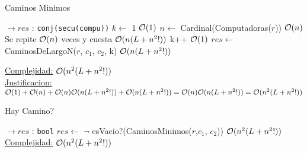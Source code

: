 \begin{Algoritmos}
\begin{algorithm}
\caption{Caminos Minimos}
\begin{algorithmic}[1]
   $\to res$ : \texttt{conj(secu(compu))}  
   \State $k \gets$ 1 \Comment $\mathcal{O}(1)$
   \State $n \gets$ Cardinal(Computadoras($r$))  \Comment $\mathcal{O}(n)$
    \Comment Se repite $\mathcal{O}(n)$ veces y cuesta  $\mathcal{O}(n(L + n^2!))$
     \State k++ \Comment $\mathcal{O}(1)$
   \EndWhile
   \State $res \gets$ CaminosDeLargoN($r$, $c_1$, $c_2$, k) \Comment $\mathcal{O}(n(L + n^2!))$
\EndProcedure
\end{algorithmic}
\underline{Complejidad:} $\mathcal{O}(n^2 (L + n^2!))$ \\ 
\underline{Justificacion:} $\mathcal{O}(1) + \mathcal{O}(n) + \mathcal{O}(n)\mathcal{O}(n(L + n^2!)) + \mathcal{O}(n(L + n^2!)) = \mathcal{O}(n)\mathcal{O}(n(L + n^2!)) = \mathcal{O}(n^2(L + n^2!))$
\end{algorithm}


\begin{algorithm}
\caption{Hay Camino?}
\begin{algorithmic}[1]
   $\to res$ : \texttt{bool} 
   \State $res \gets$ $\neg$ esVacio?(CaminosMinimos($r$,$c_1$, $c_2$)) \Comment  $\mathcal{O}(n^2 (L + n^2!))$ 
\EndProcedure
\underline{Complejidad:} $\mathcal{O}(n^2 (L + n^2!))$ 
\end{algorithmic}
\end{algorithm}


\end{Algoritmos}
